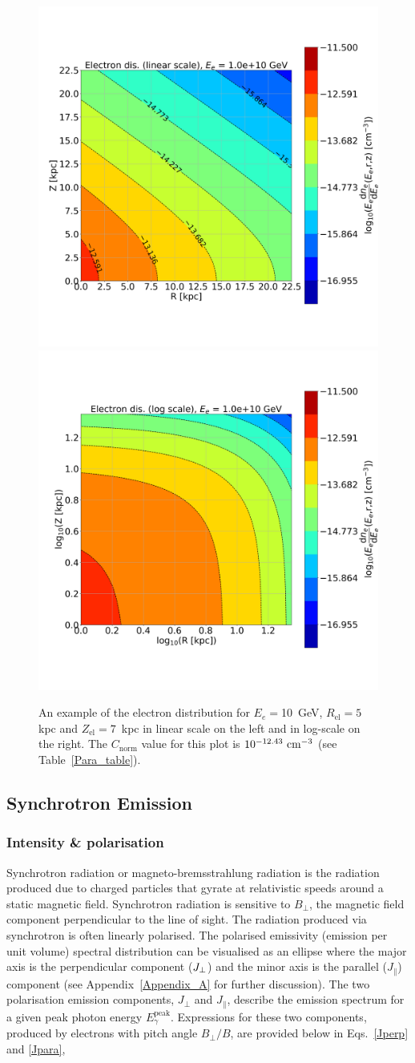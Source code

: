 \documentclass[usenatbib]{mnras}
\begin{document}
\begin{figure}
\centering
\includegraphics[width=0.49\linewidth]{Images/Linear_EdNdE.png}%
\includegraphics[width = 0.49\linewidth]{Images/Log_EdNdE.png}
\caption{An example of the electron distribution for $E_e = $10~GeV, $R_{\mathrm{el}} = 5$ kpc and $Z_{\mathrm{el}} = 7$~kpc in linear scale on the left and in log-scale on the right. The $C_\mathrm{norm}$ value for this plot is $10^{-12.43}~{\rm cm}^{-3}$ (see Table~\ref{Para_table}).}  
\label{fig:electron_density}
\end{figure}
\subsection{Synchrotron Emission}\label{Synchrotron_theory}

\subsubsection{Intensity \& polarisation}
Synchrotron radiation or magneto-bremsstrahlung radiation is the radiation produced due to charged particles that gyrate at relativistic speeds around a static magnetic field. Synchrotron radiation is sensitive to $B_{\perp}$, the magnetic field component perpendicular to the line of sight. The radiation produced via synchrotron is often linearly polarised.
The polarised emissivity (emission per unit volume) spectral distribution can be visualised as an ellipse where the major axis is the perpendicular component ($J_{\rm \perp}$) and the minor axis is the parallel ($J_{\parallel}$) component (see Appendix~\ref{Appendix_A} for further discussion). 
The two polarisation emission components, $J_{\perp}$ and $J_{\parallel}$, describe the emission spectrum for a given peak photon energy $E_{\gamma}^{\mathrm{peak}}$.
Expressions for these two components, produced by electrons with pitch angle $B_{\perp}/B$, are provided below in Eqs.~\ref{Jperp} and \ref{Jpara},
\end{document}
